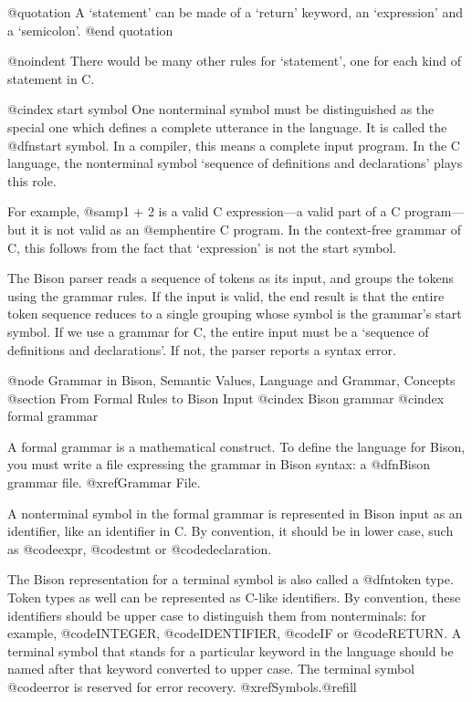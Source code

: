 @quotation
A `statement' can be made of a `return' keyword, an `expression' and a
`semicolon'.
@end quotation

@noindent
There would be many other rules for `statement', one for each kind of
statement in C.

@cindex start symbol
One nonterminal symbol must be distinguished as the special one which
defines a complete utterance in the language.  It is called the @dfn{start
symbol}.  In a compiler, this means a complete input program.  In the C
language, the nonterminal symbol `sequence of definitions and declarations'
plays this role.

For example, @samp{1 + 2} is a valid C expression---a valid part of a C
program---but it is not valid as an @emph{entire} C program.  In the
context-free grammar of C, this follows from the fact that `expression' is
not the start symbol.

The Bison parser reads a sequence of tokens as its input, and groups the
tokens using the grammar rules.  If the input is valid, the end result is
that the entire token sequence reduces to a single grouping whose symbol is
the grammar's start symbol.  If we use a grammar for C, the entire input
must be a `sequence of definitions and declarations'.  If not, the parser
reports a syntax error.

@node Grammar in Bison, Semantic Values, Language and Grammar, Concepts
@section From Formal Rules to Bison Input
@cindex Bison grammar
@cindex formal grammar

A formal grammar is a mathematical construct.  To define the language
for Bison, you must write a file expressing the grammar in Bison syntax:
a @dfn{Bison grammar} file.  @xref{Grammar File}.

A nonterminal symbol in the formal grammar is represented in Bison input
as an identifier, like an identifier in C.  By convention, it should be
in lower case, such as @code{expr}, @code{stmt} or @code{declaration}.

The Bison representation for a terminal symbol is also called a @dfn{token
type}.  Token types as well can be represented as C-like identifiers.  By
convention, these identifiers should be upper case to distinguish them from
nonterminals: for example, @code{INTEGER}, @code{IDENTIFIER}, @code{IF} or
@code{RETURN}.  A terminal symbol that stands for a particular keyword in
the language should be named after that keyword converted to upper case.
The terminal symbol @code{error} is reserved for error recovery.
@xref{Symbols}.@refill

